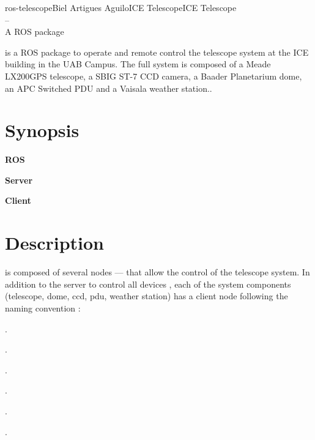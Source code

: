 \documentclass[a4paper,english]{article}
\begin{document}
\begin{Name}{1}{ros-telescope}{Biel Artigues Aguilo}{ICE Telescope}{ICE Telescope\\--\\ A ROS package}

   is a ROS package to operate and remote control the telescope system at the ICE building in the UAB Campus. The full system is composed of a Meade LX200GPS telescope, a SBIG ST-7 CCD camera, a Baader Planetarium dome, an APC Switched PDU and a Vaisala weather station.. 
  \end{Name}

\section{Synopsis}

\textbf{ROS}


\noindent
\textbf{Server}

  

\noindent
\textbf{Client}

     

\section{Description}
 is composed of several nodes ---- that allow the control of the telescope system. In addition to the server to control all devices , each of the system components (telescope, dome, ccd, pdu, weather station) has a client node following the naming convention : 
\begin{Description}\setlength{\itemsep}{0cm}
\item[\Opt{Full-Server}] .
\item[\Opt{Telescope}] .
\item[\Opt{CCD}] .
\item[\Opt{Dome}] .
\item[\Opt{PDU}] .
\item[\Opt{WS}]	.
\end{Description}
\end{document}
